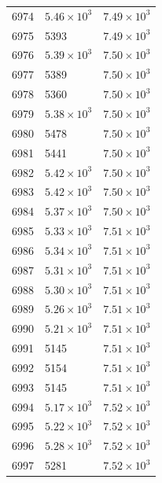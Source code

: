 \begin{table}[H]
\begin{tabular}{lll}
6974 & $\displaystyle 5.46 \times 10^{3}$ & $\displaystyle 7.49 \times 10^{3}$ \\
6975 & 5393 & $\displaystyle 7.49 \times 10^{3}$ \\
6976 & $\displaystyle 5.39 \times 10^{3}$ & $\displaystyle 7.50 \times 10^{3}$ \\
6977 & 5389 & $\displaystyle 7.50 \times 10^{3}$ \\
6978 & 5360 & $\displaystyle 7.50 \times 10^{3}$ \\
6979 & $\displaystyle 5.38 \times 10^{3}$ & $\displaystyle 7.50 \times 10^{3}$ \\
6980 & 5478 & $\displaystyle 7.50 \times 10^{3}$ \\
6981 & 5441 & $\displaystyle 7.50 \times 10^{3}$ \\
6982 & $\displaystyle 5.42 \times 10^{3}$ & $\displaystyle 7.50 \times 10^{3}$ \\
6983 & $\displaystyle 5.42 \times 10^{3}$ & $\displaystyle 7.50 \times 10^{3}$ \\
6984 & $\displaystyle 5.37 \times 10^{3}$ & $\displaystyle 7.50 \times 10^{3}$ \\
6985 & $\displaystyle 5.33 \times 10^{3}$ & $\displaystyle 7.51 \times 10^{3}$ \\
6986 & $\displaystyle 5.34 \times 10^{3}$ & $\displaystyle 7.51 \times 10^{3}$ \\
6987 & $\displaystyle 5.31 \times 10^{3}$ & $\displaystyle 7.51 \times 10^{3}$ \\
6988 & $\displaystyle 5.30 \times 10^{3}$ & $\displaystyle 7.51 \times 10^{3}$ \\
6989 & $\displaystyle 5.26 \times 10^{3}$ & $\displaystyle 7.51 \times 10^{3}$ \\
6990 & $\displaystyle 5.21 \times 10^{3}$ & $\displaystyle 7.51 \times 10^{3}$ \\
6991 & 5145 & $\displaystyle 7.51 \times 10^{3}$ \\
6992 & 5154 & $\displaystyle 7.51 \times 10^{3}$ \\
6993 & 5145 & $\displaystyle 7.51 \times 10^{3}$ \\
6994 & $\displaystyle 5.17 \times 10^{3}$ & $\displaystyle 7.52 \times 10^{3}$ \\
6995 & $\displaystyle 5.22 \times 10^{3}$ & $\displaystyle 7.52 \times 10^{3}$ \\
6996 & $\displaystyle 5.28 \times 10^{3}$ & $\displaystyle 7.52 \times 10^{3}$ \\
6997 & 5281 & $\displaystyle 7.52 \times 10^{3}$ \\

\end{tabular}
\end{table}
